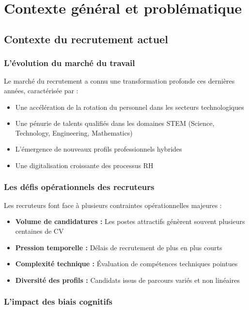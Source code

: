 \documentclass[12pt,a4paper]{report}
\begin{document}
\chapter{Contexte général et problématique}
\label{chap:contexte}

\section{Contexte du recrutement actuel}

\subsection{L'évolution du marché du travail}

Le marché du recrutement a connu une transformation profonde ces dernières années, caractérisée par :
\begin{itemize}
\item Une accélération de la rotation du personnel dans les secteurs technologiques
\item Une pénurie de talents qualifiés dans les domaines STEM (Science, Technology, Engineering, Mathematics)
\item L'émergence de nouveaux profils professionnels hybrides
\item Une digitalisation croissante des processus RH
\end{itemize}

\subsection{Les défis opérationnels des recruteurs}

Les recruteurs font face à plusieurs contraintes opérationnelles majeures :
\begin{itemize}
\item \textbf{Volume de candidatures :} Les postes attractifs génèrent souvent plusieurs centaines de CV
\item \textbf{Pression temporelle :} Délais de recrutement de plus en plus courts
\item \textbf{Complexité technique :} Évaluation de compétences techniques pointues
\item \textbf{Diversité des profils :} Candidats issus de parcours variés et non linéaires
\end{itemize}

\subsection{L'impact des biais cognitifs}
\end{document}
